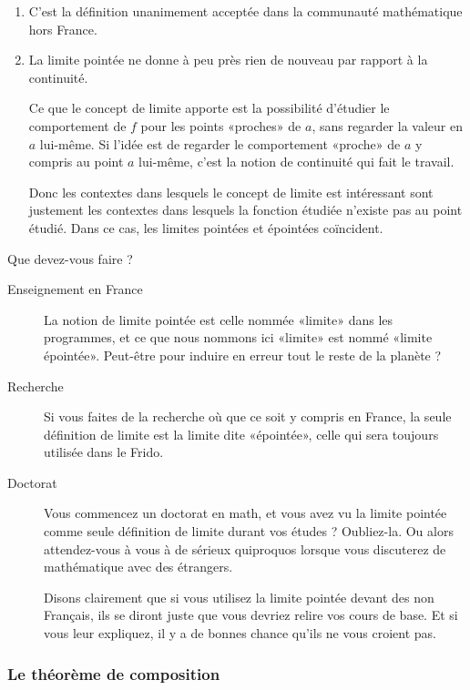 \begin{enumerate}
    \item
       C'est la définition unanimement acceptée dans la communauté mathématique hors France.
   \item
       La limite pointée ne donne à peu près rien de nouveau par rapport à la continuité.
       
       Ce que le concept de limite apporte est la possibilité d'étudier le comportement de \( f\) pour les points «proches» de \( a\), sans regarder la valeur en \( a\) lui-même. Si l'idée est de regarder le comportement «proche» de \( a\) y compris au point \( a\) lui-même, c'est la notion de continuité qui fait le travail.

       Donc les contextes dans lesquels le concept de limite est intéressant sont justement les contextes dans lesquels la fonction étudiée n'existe pas au point étudié. Dans ce cas, les limites pointées et épointées coïncident.
\end{enumerate}

Que devez-vous faire ?
\begin{description}
    \item[Enseignement en France] La notion de limite pointée est celle nommée «limite» dans les programmes, et ce que nous nommons ici «limite» est nommé «limite épointée». Peut-être pour induire en erreur tout le reste de la planète ?
    \item[Recherche] Si vous faites de la recherche où que ce soit y compris en France, la seule définition de limite est la limite dite «épointée», celle qui sera toujours utilisée dans le Frido.
    \item[Doctorat] Vous commencez un doctorat en math, et vous avez vu la limite pointée comme seule définition de limite durant vos études ? Oubliez-la. Ou alors attendez-vous à vous à de sérieux quiproquos lorsque vous discuterez de mathématique avec des étrangers. 

        Disons clairement que si vous utilisez la limite pointée devant des non Français, ils se diront juste que vous devriez relire vos cours de base. Et si vous leur expliquez, il y a de bonnes chance qu'ils ne vous croient pas.
\end{description}

\subsubsection{Le théorème de composition}

